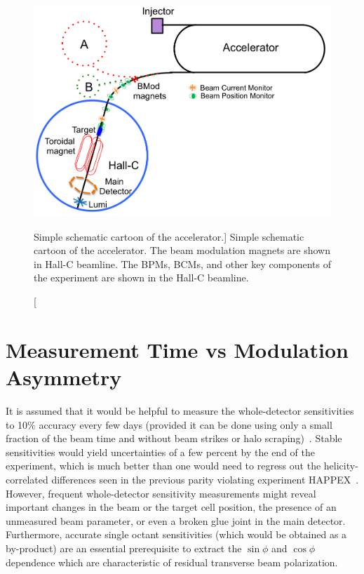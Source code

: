 \begin{singlespace}
\begin{figure}[h]
	\begin{center}
	\includegraphics[width=15.0cm]{figures/BModAcceleratorSketch}
	\end{center}
	\caption
	[Simple schematic cartoon of the accelerator.]
	{Simple schematic cartoon of the accelerator. The beam modulation magnets are shown in Hall-C beamline. The BPMs, BCMs, and other key components of the experiment are shown in the Hall-C beamline. }
	\label{fig:BModAcceleratorSketch}
\end{figure}
\end{singlespace}


\section{Measurement Time vs Modulation Asymmetry}
\label{Measurement Time vs Modulation Asymmetry}
It is assumed that it would be helpful to measure the whole-detector sensitivities to 10\% accuracy every few days (provided it can be done using only a small fraction of the beam time and without beam strikes or halo scraping)~\cite{mack_communication}. 
Stable sensitivities would yield uncertainties of a few percent by the end of the experiment, which is much better than one would need to regress out the helicity-correlated differences seen in the previous parity violating experiment HAPPEX~\cite{PhysRevLett.98.032301}. However, frequent whole-detector sensitivity measurements might reveal important changes in the beam or the target cell position, the presence of an unmeasured beam parameter, or even a broken glue joint in the main detector. Furthermore, accurate single octant sensitivities (which would be obtained as a by-product) are an essential prerequisite to extract the $\sin\phi$ and $\cos\phi$ dependence which are characteristic of residual transverse beam polarization.

